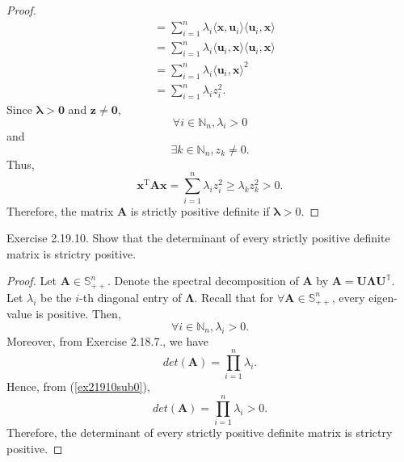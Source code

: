 \documentclass{article}
\theoremstyle{plain}
\begin{document}
\begin{proof}
\begin{equation*}
\begin{split}
			&= \sum_{i=1}^n \lambda_i \langle \bm{x} , \bm{u}_i \rangle \langle \bm{u}_i , \bm{x} \rangle \\
			&= \sum_{i=1}^n \lambda_i \langle \bm{u}_i , \bm{x} \rangle \langle \bm{u}_i , \bm{x} \rangle \\
			&= \sum_{i=1}^n \lambda_i \langle \bm{u}_i , \bm{x} \rangle^2 \\
			&= \sum_{i=1}^n \lambda_i z_i^2 .
		\end{split}
	\end{equation*}
	Since $\bm{\lambda} > \bm{0}$ and $\bm{z} \neq \bm{0}$,
	\begin{equation*}
		\forall i \in \mathbb{N}_n, \lambda_i > 0
	\end{equation*}
	and
	\begin{equation*}
		\exists k \in \mathbb{N}_n, z_k \neq 0 .
	\end{equation*}
	Thus,
	\begin{equation*}
		\bm{x}^{\mathrm{T}} \bm{A} \bm{x} = \sum_{i=1}^n \lambda_i z_i^2 \geq \lambda_k z_k^2 > 0 .
	\end{equation*}
	Therefore, the matrix $\bm{A}$ is strictly positive definite if $\bm{\lambda} > 0$.
\end{proof}


\begin{itembox}[l]{Exercise 2.19.10.}
	Show that the determinant of every strictly positive definite matrix is strictry positive.
\end{itembox}


\begin{proof}
	Let $\bm{A} \in \mathbb{S}_{++}^n$. Denote the spectral decomposition of $\bm{A}$ by
	$\bm{A} = \bm{U} \bm{\Lambda} \bm{U}^\mathbb{T}$. Let $\lambda_i$ be the $i$-th diagonal
	entry of $\bm{\Lambda}$.
	Recall that for $\forall \bm{A} \in \mathbb{S}_{++}^n$, every eigen-value is positive. Then,
	\begin{equation}
		\label{ex21910sub0}
		\forall i \in \mathbb{N}_n, \lambda_i > 0 .
	\end{equation}
	Moreover, from Exercise 2.18.7., we have
	\begin{equation}
		\label{ex21910sub1}
		det(\bm{A}) = \prod_{i=1}^n \lambda_i .
	\end{equation}
	Hence, from (\ref{ex21910sub0}),
	\begin{equation*}
		det(\bm{A}) = \prod_{i=1}^n \lambda_i > 0 .
	\end{equation*}
	Therefore, the determinant of every strictly positive definite matrix is strictry positive.
\end{proof}
\end{document}
